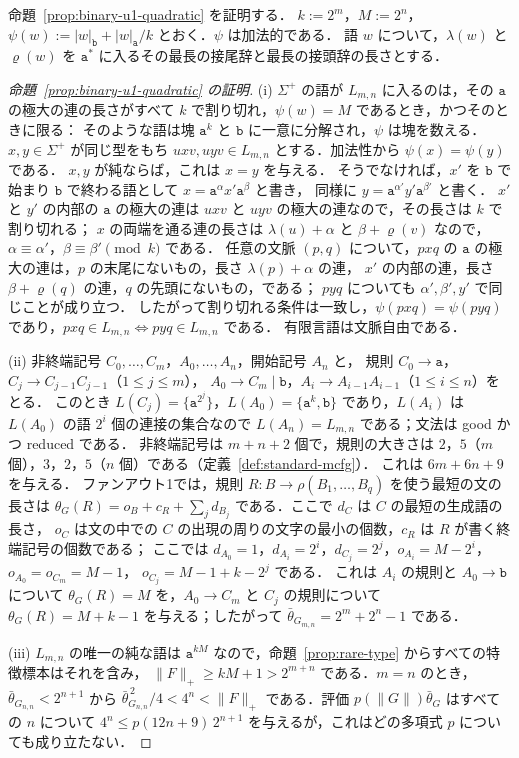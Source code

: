 命題~\ref{prop:binary-u1-quadratic} を証明する．
$k:=2^m$，$M:=2^n$，$\psi(w):=|w|_{\mathtt b}+|w|_{\mathtt a}/k$ とおく．$\psi$ は加法的である．
語 $w$ について，$\lambda(w)$ と $\varrho(w)$ を $\mathtt a^*$ に入るその最長の接尾辞と最長の接頭辞の長さとする．

\begin{proof}[命題~\ref{prop:binary-u1-quadratic} の証明]
(i) $\Sigma^+$ の語が $L_{m,n}$ に入るのは，その $\mathtt a$ の極大の連の長さがすべて $k$ で割り切れ，$\psi(w)=M$ であるとき，かつそのときに限る：
そのような語は塊 $\mathtt a^k$ と $\mathtt b$ に一意に分解され，$\psi$ は塊を数える．
$x,y\in\Sigma^+$ が同じ型をもち $uxv,uyv\in L_{m,n}$ とする．加法性から $\psi(x)=\psi(y)$ である．
$x,y$ が純ならば，これは $x=y$ を与える．
そうでなければ，$x'$ を $\mathtt b$ で始まり $\mathtt b$ で終わる語として $x=\mathtt a^{\alpha}x'\mathtt a^{\beta}$ と書き，
同様に $y=\mathtt a^{\alpha'}y'\mathtt a^{\beta'}$ と書く．
$x'$ と $y'$ の内部の $\mathtt a$ の極大の連は $uxv$ と $uyv$ の極大の連なので，その長さは $k$ で割り切れる；
$x$ の両端を通る連の長さは $\lambda(u)+\alpha$ と $\beta+\varrho(v)$ なので，$\alpha\equiv\alpha'$，$\beta\equiv\beta'\pmod k$ である．
任意の文脈 $(p,q)$ について，$pxq$ の $\mathtt a$ の極大の連は，$p$ の末尾にないもの，長さ $\lambda(p)+\alpha$ の連，
$x'$ の内部の連，長さ $\beta+\varrho(q)$ の連，$q$ の先頭にないもの，である；
$pyq$ についても $\alpha',\beta',y'$ で同じことが成り立つ．
したがって割り切れる条件は一致し，$\psi(pxq)=\psi(pyq)$ であり，$pxq\in L_{m,n}\iff pyq\in L_{m,n}$ である．
有限言語は文脈自由である．

(ii) 非終端記号 $C_0,\ldots,C_m$，$A_0,\ldots,A_n$，開始記号 $A_n$ と，
規則 $C_0\to\mathtt a$，$C_j\to C_{j-1}C_{j-1}$（$1\le j\le m$），
$A_0\to C_m\mid\mathtt b$，$A_i\to A_{i-1}A_{i-1}$（$1\le i\le n$）をとる．
このとき $L(C_j)=\{\mathtt a^{2^j}\}$，$L(A_0)=\{\mathtt a^k,\mathtt b\}$ であり，$L(A_i)$ は
$L(A_0)$ の語 $2^i$ 個の連接の集合なので $L(A_n)=L_{m,n}$ である；文法は good かつ reduced である．
非終端記号は $m+n+2$ 個で，規則の大きさは $2$，$5$（$m$ 個），$3$，$2$，$5$（$n$ 個）である（定義~\ref{def:standard-mcfg}）．
これは $6m+6n+9$ を与える．
ファンアウト1では，規則 $R:B\to\rho(B_1,\ldots,B_q)$ を使う最短の文の長さは
$\theta_G(R)=o_B+c_R+\sum_jd_{B_j}$ である．ここで $d_C$ は $C$ の最短の生成語の長さ，
$o_C$ は文の中での $C$ の出現の周りの文字の最小の個数，$c_R$ は $R$ が書く終端記号の個数である；
ここでは $d_{A_0}=1$，$d_{A_i}=2^i$，$d_{C_j}=2^j$，$o_{A_i}=M-2^i$，$o_{A_0}=o_{C_m}=M-1$，
$o_{C_j}=M-1+k-2^j$ である．
これは $A_i$ の規則と $A_0\to\mathtt b$ について $\theta_G(R)=M$ を，$A_0\to C_m$ と $C_j$ の規則について
$\theta_G(R)=M+k-1$ を与える；したがって $\bar\theta_{G_{m,n}}=2^m+2^n-1$ である．

(iii) $L_{m,n}$ の唯一の純な語は $\mathtt a^{kM}$ なので，命題~\ref{prop:rare-type} からすべての特徴標本はそれを含み，
$\|F\|_+\ge kM+1>2^{m+n}$ である．$m=n$ のとき，$\bar\theta_{G_{n,n}}<2^{n+1}$ から
$\bar\theta_{G_{n,n}}^{\,2}/4<4^n<\|F\|_+$ である．評価 $p(\|G\|)\bar\theta_G$ はすべての $n$ について
$4^n\le p(12n+9)\,2^{n+1}$ を与えるが，これはどの多項式 $p$ についても成り立たない．
\end{proof}

